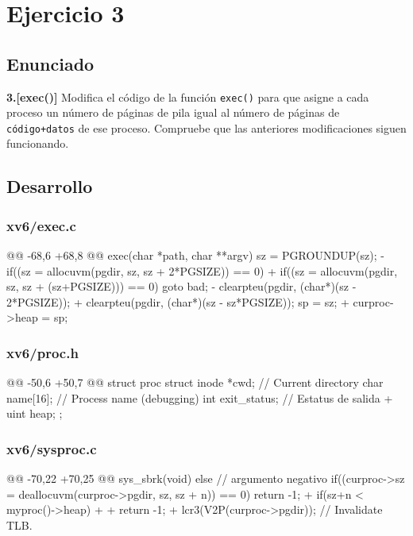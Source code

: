 \section{Ejercicio 3}

\subsection{Enunciado}
\begin{ejer}
    \textbf{3.[exec()]} Modifica el código de la función \texttt{exec()} para que asigne 
    a cada proceso un número de páginas de pila igual al número de páginas de \texttt{código+datos} 
    de ese proceso. Compruebe que las anteriores modificaciones siguen funcionando.
\end{ejer}

\subsection{Desarrollo}

\subsubsection{xv6/exec.c}
\begin{listing}
@@ -68,6 +68,8 @@ exec(char *path, char **argv)
    sz = PGROUNDUP(sz);
-   if((sz = allocuvm(pgdir, sz, sz + 2*PGSIZE)) == 0)    
+   if((sz = allocuvm(pgdir, sz, sz + (sz+PGSIZE))) == 0)
        goto bad;
-   clearpteu(pgdir, (char*)(sz - 2*PGSIZE));
+   clearpteu(pgdir, (char*)(sz - sz*PGSIZE));
    sp = sz;
+   curproc->heap = sp;
\end{listing}

\subsubsection{xv6/proc.h}
\begin{listing}
@@ -50,6 +50,7 @@ struct proc {
        struct inode *cwd;           // Current directory
        char name[16];               // Process name (debugging)
        int exit_status;             // Estatus de salida
+       uint heap;   
    };
\end{listing}

\subsubsection{xv6/sysproc.c}
\begin{listing}
@@ -70,22 +70,25 @@ sys_sbrk(void)
    else // argumento negativo
    {
        if((curproc->sz = deallocuvm(curproc->pgdir, sz, sz + n)) == 0)
            return -1;
+       if(sz+n < myproc()->heap)
+       {
+           return -1;
+       }
    }
    lcr3(V2P(curproc->pgdir));  // Invalidate TLB.
\end{listing}
